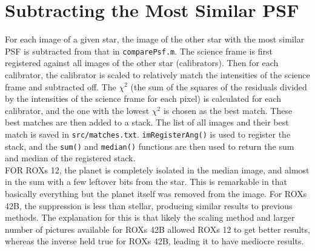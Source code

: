 \documentclass[12pt]{article}
\begin{document}
\section{Subtracting the Most Similar PSF}
For each image of a given star, the image of the other star with the most similar PSF is subtracted from that in \texttt{comparePsf.m}. The science frame is first registered against all images of the other star (calibrators). Then for each calibrator, the calibrator is scaled to relatively match the intensities of the science frame and subtracted off. The $\chi^{2}$ (the sum of the squares of the residuals divided by the intensities of the science frame for each pixel) is calculated for each calibrator, and the one with the lowest $\chi^{2}$ is chosen as the best match. These best matches are then added to a stack. The list of all images and their best match is saved in \texttt{src/matches.txt}. \texttt{imRegisterAng()} is used to register the stack, and the \texttt{sum()} and \texttt{median()} functions are then used to return the sum and median of the registered stack.\\
\indent FOR ROXs 12, the planet is completely isolated in the median image, and almost in the sum with a few leftover bits from the star. This is remarkable in that basically everything but the planet itself was removed from the image. For ROXs 42B, the suppression is less than stellar, producing similar results to previous methods. The explanation for this is that likely the scaling method and larger number of pictures available for ROXs 42B allowed ROXs 12 to get better results, whereas the inverse held true for ROXs 42B, leading it to have mediocre results.
\end{document}
